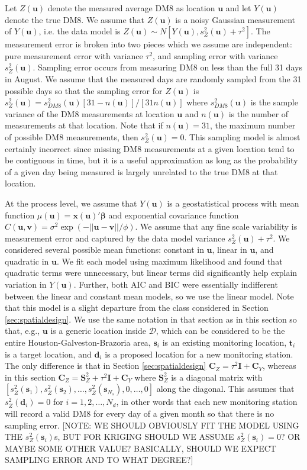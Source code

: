 \documentclass[12pt]{article}
\begin{document}
Let $Z(\bm{u})$ denote the measured average DM8 as location $\bm{u}$ and let $Y(\bm{u})$ denote the true DM8. We assume that $Z(\bm{u})$ is a noisy Gaussian measurement of $Y(\bm{u})$, i.e. the data model is $Z(\bm{u}) \sim N[Y(\bm{u}), s_Z^2(\bm{u}) + \tau^2]$. The measurement error is broken into two pieces which we assume are independent: pure measurement error with variance $\tau^2$, and sampling error with variance $s_Z^2(\bm{u})$. Sampling error occurs from measuring DM8 on less than the full 31 days in August. We assume that the measured days are randomly sampled from the 31 possible days so that the sampling error for $Z(\bm{u})$ is $s_Z^2(\bm{u}) = s^2_{DM8}(\bm{u})[31 - n(\bm{u})]/[31n(\bm{u})]$ where $s^2_{DM8}(\bm{u})$ is the sample variance of the DM8 measurements at location $\bm{u}$ and $n(\bm{u})$ is the number of measurements at that location. Note that if $n(\bm{u})=31$, the maximum number of possible DM8 measurements, then $s^2_Z(\bm{u}) = 0$. This sampling model is almost certainly incorrect since missing DM8 measurements at a given location tend to be contiguous in time, but it is a useful approximation as long as the probability of a given day being measured is largely unrelated to the true DM8 at that location.

At the process level, we assume that $Y(\bm{u})$ is a geostatistical process with mean function $\mu(\bm{u}) = \bm{x}(\bm{u})'\bm{\beta}$ and exponential covariance function $C(\bm{u},\bm{v}) = \sigma^2\exp(-||\bm{u} - \bm{v}||/\phi)$. We assume that any fine scale variability is measurement error and captured by the data model variance $s_Z^2(\bm{u}) + \tau^2$. We considered several possible mean functions: constant in $\bm{u}$, linear in $\bm{u}$, and quadratic in $\bm{u}$. We fit each model using maximum likelihood and found that quadratic terms were unnecessary, but linear terms did significantly help explain variation in $Y(\bm{u})$. Further, both AIC and BIC were essentially indifferent between the linear and constant mean models, so we use the linear model. Note that this model is a slight departure from the class considered in Section \ref{sec:spatialdesign}. We use the same notation in that section as in this section so that, e.g., $\bm{u}$ is a generic location inside $\mathcal{D}$, which can be considered to be the entire Houston-Galveston-Brazoria area, $\bm{s}_i$ is an existing monitoring location, $\bm{t}_i$ is a target location, and $\bm{d}_i$ is a proposed location for a new monitoring station. The only difference is that in Section \ref{sec:spatialdesign} $\bm{C}_Z = \tau^2\bm{I} + \bm{C}_Y$, whereas in this section $\bm{C}_Z = \bm{S}_Z^2 + \tau^2\bm{I} + \bm{C}_Y$ where $\bm{S}_Z^2$ is a diagonal matrix with $[s_Z^2(\bm{s}_1), s_Z^2(\bm{s}_2), \dots, s_Z^2(\bm{s}_{N_s}), 0, \dots, 0]$ along the diagonal. This assumes that $s_Z^2(\bm{d}_i)=0$ for $i=1,2,\dots,N_d$, in other words that each new monitoring station will record a valid DM8 for every day of a given month so that there is no sampling error. [NOTE: WE SHOULD OBVIOUSLY FIT THE MODEL USING THE $s_Z^2(\bm{s}_{i})$s, BUT FOR KRIGING SHOULD WE ASSUME $s_Z^2(\bm{s}_{i})=0$? OR MAYBE SOME OTHER VALUE? BASICALLY, SHOULD WE EXPECT SAMPLING ERROR AND TO WHAT DEGREE?]
\end{document}
